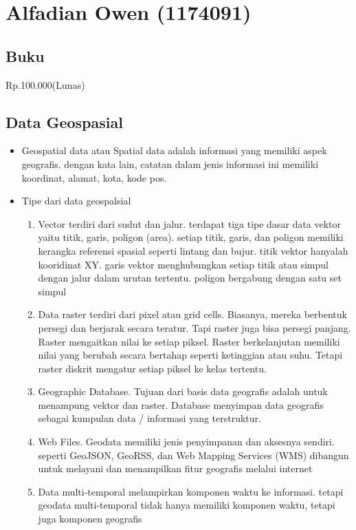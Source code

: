 \section{Alfadian Owen (1174091)}
\subsection{Buku}
Rp.100.000(Lunas)
\subsection{Data Geospasial}
\begin{itemize}
	\item Geospatial data atau Spatial data adalah informasi yang memiliki aspek geografis. dengan kata lain, catatan dalam jenis informasi ini memiliki koordinat, alamat, kota, kode pos.
	\item Tipe dari data geospalsial
	\begin{enumerate}

	\item Vector terdiri dari sudut dan jalur. terdapat tiga tipe dasar data vektor yaitu titik, garis, poligon (area). setiap titik, garis, dan poligon memiliki kerangka referensi spasial seperti lintang dan bujur. titik vektor hanyalah kooridinat XY. garis vektor menghubungkan setiap titik atau simpul dengan jalur dalam urutan tertentu. poligon bergabung dengan satu set simpul
	
	\item Data raster terdiri dari pixel atau grid cells. Biasanya, mereka berbentuk persegi dan berjarak secara teratur. Tapi raster juga bisa persegi panjang. Raster mengaitkan nilai ke setiap piksel. Raster berkelanjutan memiliki nilai yang berubah secara bertahap seperti ketinggian atau suhu. Tetapi raster diskrit mengatur setiap piksel ke kelas tertentu.
	\item Geographic Database. Tujuan dari basis data geografis adalah untuk menampung vektor dan raster. Database menyimpan data geografis sebagai kumpulan data / informasi yang terstruktur.
	\item Web Files. Geodata memiliki jenis penyimpanan dan aksesnya sendiri. seperti GeoJSON, GeoRSS, dan Web Mapping Services (WMS) dibangun untuk melayani dan menampilkan fitur geografis melalui internet
	\item Data multi-temporal melampirkan komponen waktu ke informasi. tetapi geodata multi-temporal tidak hanya memiliki komponen waktu, tetapi juga komponen geografis


	\end{enumerate}
\end{itemize}

